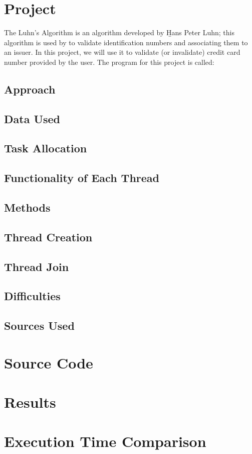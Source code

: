 \documentclass[11pt]{article}
\begin{document}
\begin{flushleft}

\section{Project}
The Luhn's Algorithm is an algorithm developed by \b{Hans Peter Luhn}; this algorithm is used by to validate identification numbers and associating them to an issuer.  In this project, we will use it to validate (or invalidate) credit card number provided by the user. The program for this project is called:

\subsection{Approach}

\subsection{Data Used}

\subsection{Task Allocation}

\subsection{Functionality of Each Thread}

\subsection{Methods}

\subsection{Thread Creation}

\subsection{Thread Join}

\subsection{Difficulties}

\subsection{Sources Used}

\section{Source Code}

\section{Results}

\section{Execution Time Comparison}

\end{flushleft}
\end{document}
